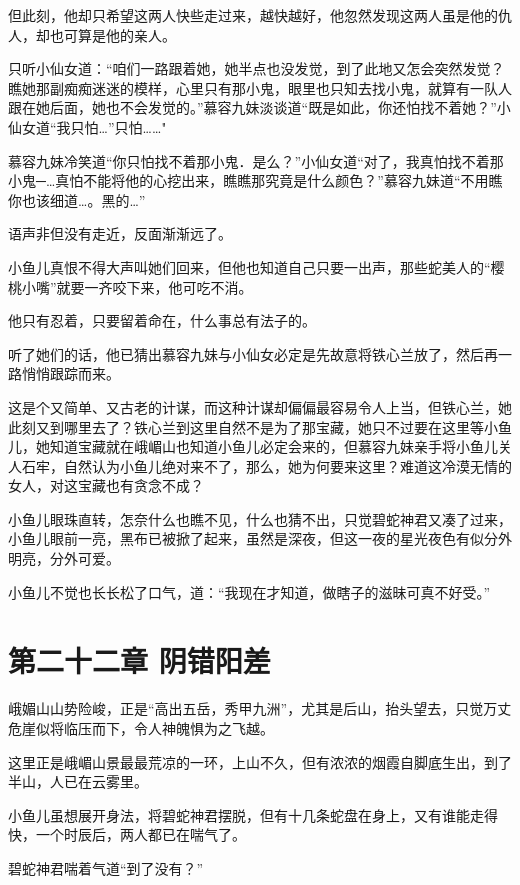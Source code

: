 \documentclass[12pt,oneside]{book}
\begin{document}
但此刻，他却只希望这两人快些走过来，越快越好，他忽然发现这两人虽是他的仇人，却也可算是他的亲人。

只听小仙女道：``咱们一路跟着她，她半点也没发觉，到了此地又怎会突然发觉？瞧她那副痴痴迷迷的模样，心里只有那小鬼，眼里也只知去找小鬼，就算有一队人跟在她后面，她也不会发觉的。''慕容九妹淡谈道``既是如此，你还怕找不着她？''小仙女道``我只怕\ldots{}''只怕\ldots\ldots"

慕容九妹冷笑道``你只怕找不着那小鬼．是么？''小仙女道``对了，我真怕找不着那小鬼─\ldots 真怕不能将他的心挖出来，瞧瞧那究竟是什么颜色？''慕容九妹道``不用瞧你也该细道\ldots。黑的\ldots{}''

语声非但没有走近，反面渐渐远了。

小鱼儿真恨不得大声叫她们回来，但他也知道自己只要一出声，那些蛇美人的``樱桃小嘴''就要一齐咬下来，他可吃不消。

他只有忍着，只要留着命在，什么事总有法子的。

听了她们的话，他已猜出慕容九妹与小仙女必定是先故意将铁心兰放了，然后再一路悄悄跟踪而来。

这是个又简单、又古老的计谋，而这种计谋却偏偏最容易令人上当，但铁心兰，她此刻又到哪里去了？铁心兰到这里自然不是为了那宝藏，她只不过要在这里等小鱼儿，她知道宝藏就在峨嵋山也知道小鱼儿必定会来的，但慕容九妹亲手将小鱼儿关人石牢，自然认为小鱼儿绝对来不了，那么，她为何要来这里？难道这冷漠无情的女人，对这宝藏也有贪念不成？

小鱼儿眼珠直转，怎奈什么也瞧不见，什么也猜不出，只觉碧蛇神君又凑了过来，小鱼儿眼前一亮，黑布已被掀了起来，虽然是深夜，但这一夜的星光夜色有似分外明亮，分外可爱。

小鱼儿不觉也长长松了口气，道：``我现在才知道，做瞎子的滋昧可真不好受。''

\hypertarget{ux7b2cux4e8cux5341ux4e8cux7ae0-ux9634ux9519ux9633ux5dee}{%
\chapter{第二十二章
阴错阳差}\label{ux7b2cux4e8cux5341ux4e8cux7ae0-ux9634ux9519ux9633ux5dee}}

峨媚山山势险峻，正是``高出五岳，秀甲九洲''，尤其是后山，抬头望去，只觉万丈危崖似将临压而下，令人神魄惧为之飞越。

这里正是峨嵋山景最最荒凉的一环，上山不久，但有浓浓的烟霞自脚底生出，到了半山，人已在云雾里。

小鱼儿虽想展开身法，将碧蛇神君摆脱，但有十几条蛇盘在身上，又有谁能走得快，一个时辰后，两人都已在喘气了。

碧蛇神君喘着气道``到了没有？''
\end{document}
